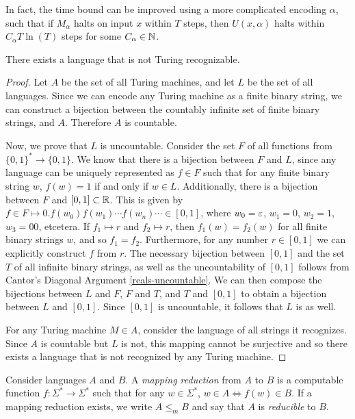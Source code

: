 \begin{rmk}
    In fact, the time bound can be improved using a more complicated encoding $\alpha$, such that if $M_{\alpha}$ halts on input $x$ within $T$ steps, then $U(x, \alpha)$ halts within $C_{\alpha}T\ln(T)$ steps for some $C_{\alpha} \in \mathbb{N}$.
\end{rmk}

\begin{thm}
    There exists a language that is not Turing recognizable.
\end{thm}

\begin{proof}
    Let $A$ be the set of all Turing machines, and let $L$ be the set of all languages. Since we can encode any Turing machine as a finite binary string, we can construct a bijection between the countably infinite set of finite binary strings, and $A$. Therefore $A$ is countable.

    Now, we prove that $L$ is uncountable. Consider the set $F$ of all functions from $\{0, 1\}^{*} \to \{0, 1\}$. We know that there is a bijection between $F$ and $L$, since any language can be uniquely represented as $f \in F$ such that for any finite binary string $w$, $f(w) = 1$ if and only if $w \in L$. Additionally, there is a bijection between $F$ and $[0, 1] \subset \mathbb{R}$. This is given by $f \in F \mapsto 0.f(w_0)f(w_1)\cdots f(w_n)\cdots \in [0, 1]$, where $w_0 = \varepsilon$, $w_1 = 0$, $w_2 = 1$, $w_3 = 00$, etcetera. If $f_1 \mapsto r$ and $f_2 \mapsto r$, then $f_1(w) = f_2(w)$ for all finite binary strings $w$, and so $f_1 = f_2$. Furthermore, for any number $r \in [0, 1]$ we can explicitly construct $f$ from $r$. The necessary bijection between $[0, 1]$ and the set $T$ of all infinite binary strings, as well as the uncountability of $[0, 1]$ follows from Cantor's Diagonal Argument \ref{reals-uncountable}. We can then compose the bijections between $L$ and $F$, $F$ and $T$, and $T$ and $[0, 1]$ to obtain a bijection between $L$ and $[0, 1]$. Since $[0, 1]$ is uncountable, it follows that $L$ is as well.

    For any Turing machine $M \in A$, consider the language of all strings it recognizes. Since $A$ is countable but $L$ is not, this mapping cannot be surjective and so there exists a language that is not recognized by any Turing machine.
\end{proof}

\begin{defn}
    Consider languages $A$ and $B$. A \emph{mapping reduction} from $A$ to $B$ is a computable function $f: \Sigma^{*} \to \Sigma^{*}$ such that for any $w \in \Sigma^{*}$, $w \in A \iff f(w) \in B$. If a mapping reduction exists, we write $A \leq_{m} B$ and say that $A$ is \emph{reducible} to $B$.
\end{defn}


